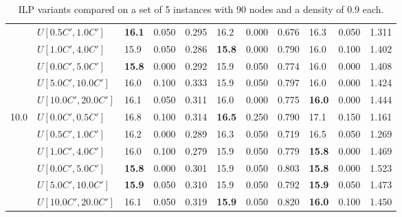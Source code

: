 \begin{table}[h]
{\begin{tabular}{|l|l||l|l|l||l|l|l||l|l|l|}
       & $U[0.5C',1.0C']$ & \textbf{16.1} & 0.050 & 0.295 & 16.2 & 0.000 & 0.676 & 16.3 & 0.050 & 1.311 \\
       & $U[1.0C',4.0C']$ & 15.9 & 0.050 & 0.286 & \textbf{15.8} & 0.000 & 0.790 & 16.0 & 0.100 & 1.402 \\
       & $U[0.0C',5.0C']$ & \textbf{15.8} & 0.000 & 0.292 & 15.9 & 0.050 & 0.774 & 16.0 & 0.000 & 1.408 \\
       & $U[5.0C',10.0C']$ & 16.0 & 0.100 & 0.333 & 15.9 & 0.050 & 0.797 & 16.0 & 0.000 & 1.424 \\
       & $U[10.0C',20.0C']$ & 16.1 & 0.050 & 0.311 & 16.0 & 0.000 & 0.775 & \textbf{16.0} & 0.000 & 1.444 \\
      \hline\hline
      \multirow{6}{*}{10.0} & $U[0.0C',0.5C']$ & 16.8 & 0.100 & 0.314 & \textbf{16.5} & 0.250 & 0.790 & 17.1 & 0.150 & 1.161 \\
       & $U[0.5C',1.0C']$ & 16.2 & 0.000 & 0.289 & 16.3 & 0.050 & 0.719 & 16.5 & 0.050 & 1.269 \\
       & $U[1.0C',4.0C']$ & 16.0 & 0.100 & 0.279 & 15.9 & 0.050 & 0.779 & \textbf{15.8} & 0.000 & 1.469 \\
       & $U[0.0C',5.0C']$ & \textbf{15.8} & 0.000 & 0.301 & 15.9 & 0.050 & 0.803 & \textbf{15.8} & 0.000 & 1.523 \\
       & $U[5.0C',10.0C']$ & \textbf{15.9} & 0.050 & 0.310 & 15.9 & 0.050 & 0.792 & \textbf{15.9} & 0.050 & 1.473 \\
       & $U[10.0C',20.0C']$ & 16.1 & 0.050 & 0.319 & \textbf{15.9} & 0.050 & 0.820 & \textbf{16.0} & 0.100 & 1.450 \\
      \hline
      \end{tabular}
      }
      \caption{ILP variants compared on a set of 5 instances with $90$ nodes and a density of $0.9$ each.}
      \label{tab:pcpn90p9RecoloredTT}\end{table}

